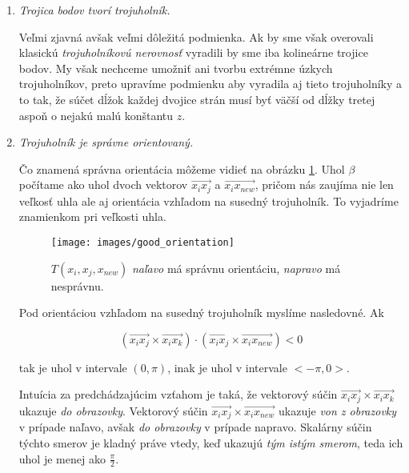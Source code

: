 \begin{enumerate}
    \item{
        \textit{Trojica bodov tvorí trojuholník.}


        Veľmi zjavná avšak veľmi dôležitá podmienka. Ak by sme však overovali klasickú 
        \textit{trojuholníkovú nerovnosť} vyradili by sme iba kolineárne trojice bodov. My však nechceme 
        umožniť ani tvorbu extrémne úzkych trojuholníkov, preto upravíme podmienku aby vyradila aj tieto
        trojuholníky a to tak, že súčet dĺžok každej dvojice strán musí byť väčší od dĺžky tretej aspoň
        o nejakú malú konštantu $z$.
    } 

    \item{
        \textit{Trojuholník je správne orientovaný.}


        Čo znamená správna orientácia môžeme vidieť na obrázku \ref{obr:good_orientation}. Uhol $\beta$
        počítame ako uhol dvoch vektorov $\overrightarrow{x_i x_j}$ a $\overrightarrow{x_i x_{new}}$, 
        pričom nás zaujíma nie len veľkosť uhla ale aj orientácia vzhľadom na susedný trojuholník. To 
        vyjadríme znamienkom pri veľkosti uhla. 

        \begin{figure}
            \centerline{\texttt{[image: images/good\_orientation]}}
            \caption[]{$T(x_i, x_j, x_{new})$ \textit{naľavo} má správnu orientáciu, \textit{napravo} má nesprávnu.}
            \label{obr:good_orientation}
        \end{figure}

        Pod orientáciou vzhľadom na susedný trojuholník myslíme nasledovné.
        Ak

        $$(\overrightarrow{x_i x_j} \times \overrightarrow{x_i x_k}) 
        \cdot (\overrightarrow{x_i x_j} \times \overrightarrow{x_i x_{new}}) < 0$$

        tak je uhol v intervale $(0, \pi)$, inak je uhol v intervale $<-\pi, 0>$.
        
        Intuícia za predchádzajúcim vzťahom je taká, že vektorový súčin 
        $\overrightarrow{x_i x_j} \times \overrightarrow{x_i x_k}$ ukazuje \textit{do obrazovky}.
        Vektorový súčin $\overrightarrow{x_i x_j} \times \overrightarrow{x_i x_{new}}$ ukazuje 
        \textit{von z obrazovky} v prípade naľavo, avšak \textit{do obrazovky} v prípade napravo.
        Skalárny súčin týchto smerov je kladný práve vtedy, keď ukazujú \textit{tým istým smerom}, 
        teda ich uhol je menej ako $\frac{\pi}{2}$. 
        
}
\end{enumerate}
